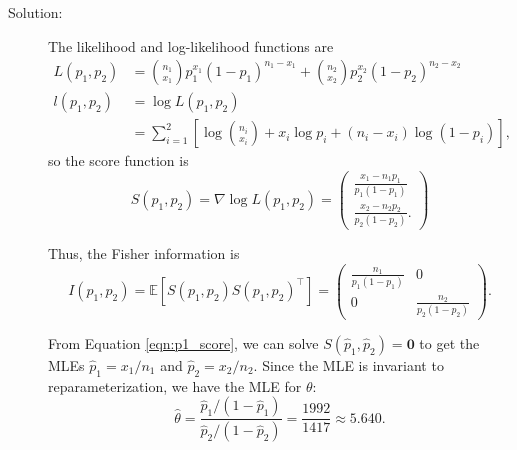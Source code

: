 \documentclass[letterpaper,11pt]{article}
\begin{document}
\begin{enumerate}
\begin{enumerate}
    \begin{description}
    \item[Solution:]
      The likelihood and log-likelihood functions are
      \begin{align}
        L\left(p_1,p_2\right)
        &= {n_1 \choose x_1}p_1^{x_1}\left(1 - p_1\right)^{n_1 - x_1} +
          {n_2 \choose x_2}p_2^{x_2}\left(1 - p_2\right)^{n_2 - x_2}
          \label{eqn:p1_likelihood}\\
        l\left(p_1,p_2\right)
        &= \log L\left(p_1,p_2\right) \nonumber\\
        &= \sum_{i=1}^2\left[
          \log {n_i \choose x_i} + x_i \log p_i + \left(n_i - x_i\right)\log\left(1 - p_i\right)
          \right],
        \nonumber
      \end{align}
      so the score function is
      \begin{equation}
        S\left(p_1,p_2\right)
        = \nabla \log L\left(p_1,p_2\right)
        = \begin{pmatrix}
          \frac{x_1 - n_1p_1}{p_1\left(1 - p_1\right)} \\
          \frac{x_2 - n_2p_2}{p_2\left(1 - p_2\right)}.
        \end{pmatrix}
        \label{eqn:p1_score}
      \end{equation}
      
      Thus, the Fisher information is
      \begin{equation}
        I\left(p_1,p_2\right) = \mathbb{E}\left[
          S\left(p_1,p_2\right)S\left(p_1,p_2\right)^\intercal
        \right]= \begin{pmatrix}
          \frac{n_1}{p_1\left(1 - p_1\right)} & 0 \\
          0 & \frac{n_2}{p_2\left(1 - p_2\right)}
        \end{pmatrix}.
        \label{eqn:p1_fisher_information}
      \end{equation}

      From Equation \ref{eqn:p1_score}, we can solve
      $S\left(\hat{p}_1,\hat{p}_2\right) = \mathbf{0}$ to get the MLEs
      $\hat{p}_1 = x_1/n_1$ and $\hat{p}_2 = x_2/n_2$. Since the MLE is
      invariant to reparameterization, we have the MLE for $\theta$:
      \begin{equation}
        \boxed{\hat{\theta} = \frac{\hat{p}_1/\left(1 - \hat{p}_1\right)}{\hat{p}_2/\left(1 - \hat{p}_2\right)} = \frac{1992}{1417} \approx 5.640.}
      \end{equation}


\end{description}
\end{enumerate}
\end{enumerate}
\end{document}
